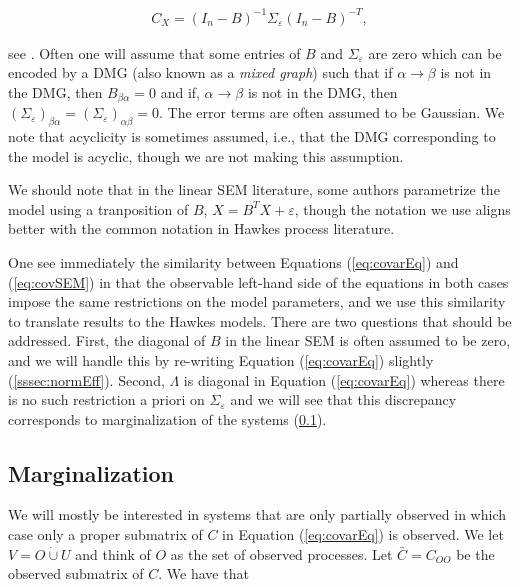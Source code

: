 \documentclass[accepted]{uai2021} %
\newcommand{\disjU}{\mathbin{\dot{\cup}}}
\begin{document}
\begin{align}
C_X = (I_n - B)^{-1}\Sigma_\varepsilon (I_n - B)^{-T},
\label{eq:covSEM}
\end{align}

see \cite{hyttinen2012}. Often one will assume that some entries of $B$ and 
$\Sigma_\varepsilon$ are zero which can be encoded by a DMG (also known as a 
\emph{mixed graph}) such that if 
$\alpha \rightarrow \beta$ is not in the DMG, then $B_{\beta\alpha} = 0$ and 
if, 
$\alpha\rightarrow\beta$ is not in the DMG, then 
$(\Sigma_\varepsilon)_{\beta\alpha} = (\Sigma_\varepsilon)_{\alpha\beta} = 0$. 
The 
error terms are often assumed to be Gaussian. We note that acyclicity is 
sometimes assumed, 
i.e., that the DMG corresponding to the model is 
acyclic, though we are not making 
this assumption.

We should note that in the linear SEM literature, some authors parametrize the 
model using a 
tranposition of $B$, $X = B^TX + \varepsilon$, though the notation we use 
aligns better with the common 
notation 
in Hawkes process literature.

One see immediately the similarity between Equations (\ref{eq:covarEq}) 
and (\ref{eq:covSEM}) in that the observable left-hand side of the equations in 
both cases impose the same restrictions on the model parameters, and we use 
this similarity to translate results to the Hawkes models. There are two 
questions that should be addressed. First, the diagonal of $B$ in 
the linear SEM is often assumed to be zero, and we will handle this by 
re-writing 
Equation (\ref{eq:covarEq}) slightly (\ref{sssec:normEff}). Second, $\Lambda$ 
is diagonal in Equation (\ref{eq:covarEq}) whereas there is no such restriction 
a priori on $\Sigma_\varepsilon$ and we will see that this discrepancy 
corresponds to marginalization of the systems (\ref{sssec:marg}).




\subsection{Marginalization}
\label{sssec:marg} 

We will mostly be interested in systems that are only partially observed in 
which case only a proper submatrix of $C$ in Equation (\ref{eq:covarEq}) is 
observed. We let $V = O \disjU 
U$ and think of $O$ as the set of observed processes. Let $\bar{C} = C_{OO}$ be 
the observed submatrix of $C$. We 
have 
that 
\end{document}
